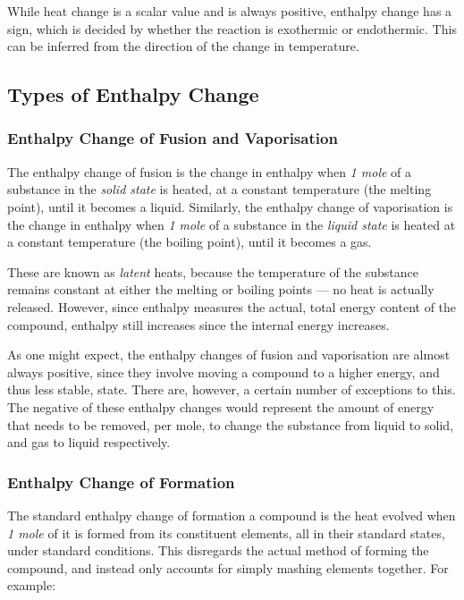 			While heat change is a scalar value and is always positive, enthalpy change has a sign, which is decided by whether the reaction is
			exothermic or endothermic. This can be inferred from the direction of the change in temperature.


		\subsection{Types of Enthalpy Change}

			\subsubsection{Enthalpy Change of Fusion and Vaporisation}

				The enthalpy change of fusion is the change in enthalpy when \textit{1 mole} of a substance in the \textit{solid state} is heated,
				at a constant temperature (the melting point), until it becomes a liquid. Similarly, the enthalpy change of vaporisation is the
				change in enthalpy when \textit{1 mole} of a substance in the \textit{liquid state} is heated at a constant temperature
				(the boiling point), until it becomes a gas.

				These are known as \textit{latent} heats, because the temperature of the substance remains constant at either the melting or
				boiling points — no heat is actually released. However, since enthalpy measures the actual, total energy content of the compound,
				enthalpy still increases since the internal energy increases.

				As one might expect, the enthalpy changes of fusion and vaporisation are almost always positive, since they involve moving a
				compound to a higher energy, and thus less stable, state. There are, however, a certain number of exceptions to this.
				The negative of these enthalpy changes would represent the amount of energy that needs to be removed, per mole, to change the
				substance from liquid to solid, and gas to liquid respectively.



			\subsubsection{Enthalpy Change of Formation}

				The standard enthalpy change of formation a compound is the heat evolved when \textit{1 mole} of it is formed from its constituent
				elements, all in their standard states, under standard conditions. This disregards the actual method of forming the compound, and
				instead only accounts for simply mashing elements together. For example:

